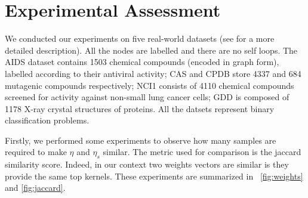 \documentclass{esannV2}
\newcommand{\1}{{\bf 1}}
\begin{document}


\section{Experimental Assessment}
We conducted our experiments on five real-world datasets (see \cite{DaSanMartino2016} for a more detailed description).
All the nodes are labelled and there are no self loops.
The AIDS dataset contains 1503 chemical compounds (encoded in graph form), labelled according to
their antiviral activity; CAS and CPDB store 4337 and 684 mutagenic
compounds respectively; NCI1 consists of 4110 chemical compounds screened for activity against 
non-small lung cancer cells; GDD is composed of 1178 X-ray crystal structures of
proteins.
All the datsets represent binary classification problems.

Firstly, we performed some experiments to observe how many samples are required to make $\eta$ and $\eta_s$ similar.
The metric used for comparison is the jaccard similarity score. Indeed, in our context two weights vectors are similar is they provide the same top kernels.
These experiments are summarized in \figurename\ \ref{fig:weights} and \ref{fig:jaccard}.

\end{document}
